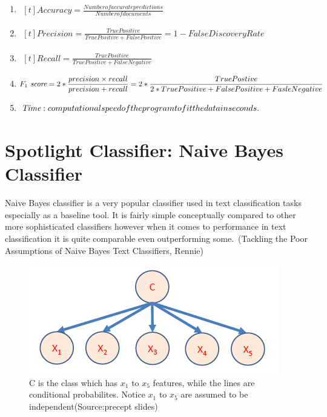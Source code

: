 \documentclass{article} %
\begin{document}
\begin{enumerate}
\item $\begin{aligned}[t]
    {Accuracy} = \frac{Number of accurate predictions}{Number of documents}
\end{aligned}$
\item $\begin{aligned}[t]
    {Precision} = \frac {True Positive}{True Positive+False Positive} = 1 - False Discovery Rate
\end{aligned}$
\item $\begin{aligned}[t]
    {Recall} = \frac {TruePositive}{TruePositive+FalseNegative}
\end{aligned}$
\item $\begin{aligned}[t]
   \emph{$F_1$ score}=  2 *\frac {precision \times recall} {precision + recall} = 2 *\frac{TruePostive}{2*TruePositive+FalsePositive+FasleNegative}
\end{aligned}$
\item $\begin{aligned}[t]
   \emph{Time} : computational speed of the program to fit the data in seconds.
\end{aligned}$
\end{enumerate}

\section{Spotlight Classifier: Naive Bayes Classifier}
Naive Bayes classifier is a very popular classifier used in text classification tasks especially as a baseline tool. It is fairly simple conceptually compared to other more sophisticated classifiers however when it comes to  performance in text classification it is quite comparable even outperforming some.~\cite{Rennie03}(Tackling the Poor Assumptions of Naive Bayes Text Classifiers, Rennie)



\begin{figure}[H]
  \centering
  \includegraphics[scale=0.5]{bernoulliNBexample1}
  \caption{C is the class which has $x_1$ to $x_5$ features, while the lines are conditional probabilites. Notice $x_1$ to $x_5$ are assumed to be independent(Source:precept slides)}   
  \label{fig:picture}
\end{figure}
\end{document}
